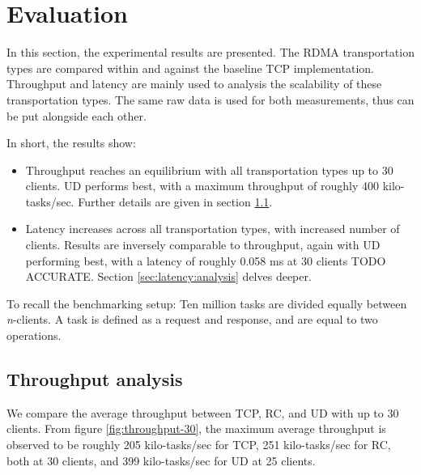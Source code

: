 
\chapter{Evaluation}\label{ch:evaluation} %



\ifpdf
    \graphicspath{{figures/PNG}}
\else
    \graphicspath{{7/figures/EPS/}{7/figures/}}
\fi


% 
In this section, the experimental results are presented.
The RDMA transportation types are compared within and against the baseline TCP implementation.
Throughput and latency are mainly used to analysis the scalability of these transportation types.
The same raw data is used for both measurements, thus can be put alongside each other.

In short, the results show:
\begin{itemize}
    \item Throughput reaches an equilibrium with all transportation types up to 30 clients.
    UD performs best, with a maximum throughput of roughly 400 kilo-tasks/sec.
    Further details are given in section \ref{sec:throughput-analysis}.
    \item Latency increases across all transportation types, with increased number of clients.
    Results are inversely comparable to throughput, again with UD performing best, with a latency of roughly 0.058 ms at 30 clients TODO ACCURATE.
    Section \ref{sec:latency:analysis} delves deeper.
\end{itemize}

To recall the benchmarking setup:
Ten million tasks are divided equally between \textit{n}-clients.
A task is defined as a request and response, and are equal to two operations.

\section{Throughput analysis}\label{sec:throughput-analysis}
We compare the average throughput between TCP, RC, and UD with up to 30 clients.
From figure \ref{fig:throughput-30}, the maximum average throughput is observed to be roughly 205 kilo-tasks/sec for TCP, 251 kilo-tasks/sec for RC, both at 30 clients, and 399 kilo-tasks/sec for UD at 25 clients.

